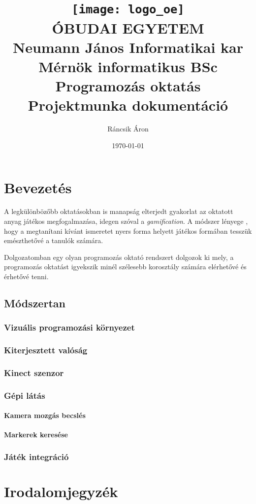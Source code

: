 \documentclass[12pt,a4paper,oneside]{report} %
\title{%
	\texttt{[image: logo\_oe]}\\
	ÓBUDAI EGYETEM\\
	Neumann János Informatikai kar\\
	Mérnök informatikus BSc\\
	\vfill
	\large \textbf{Programozás oktatás\\}
	\large Projektmunka dokumentáció
	\vfill
}
\author{Ráncsik Áron}
\date{\today}
\begin{document}
\begin{titlepage}
\maketitle
\thispagestyle{empty}
\end{titlepage}


\newpage
\tableofcontents
\newpage


\chapter{Bevezetés}
\par 
A legkülönbözőbb oktatásokban is manapság elterjedt\cite{riar2020game} gyakorlat az oktatott anyag játékos megfogalmazása, idegen szóval a \cite{Deterding2011} \textit{gamification}. A módszer lényege , hogy a megtanítani kívánt ismeretet nyers forma helyett játékos formában tesszük emészthetővé a tanulók számára. 
\par 
Dolgozatomban egy olyan programozás oktató rendszert dolgozok ki mely, a programozás oktatást igyekszik minél szélesebb korosztály számára elérhetővé és érhetővé tenni.
\section{Módszertan}
\subsection{Vizuális programozási környezet}
\subsection{Kiterjesztett valóság}
\subsection{Kinect szenzor}
\subsection{Gépi látás}
\subsubsection{Kamera mozgás becslés}
\subsubsection{Markerek keresése}
\subsection{Játék integráció}


\newpage
\chapter*{Irodalomjegyzék}
\printbibliography[heading=none]
\newpage
\listoffigures
{}
\end{document}
